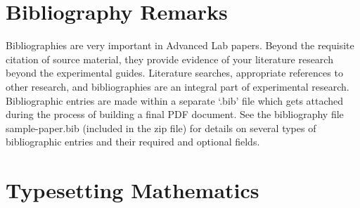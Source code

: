\section{Bibliography Remarks}

Bibliographies are very important in Advanced Lab papers.  Beyond the
requisite citation of source material, they provide evidence of your
literature research beyond the experimental guides.
Literature searches, appropriate references to other research, and bibliographies
are an integral part of experimental research.
Bibliographic entries are made within a separate `.bib'
file which gets attached during the process of building a final PDF
document.  See the bibliography file sample-paper.bib (included in the zip file)
for details on several types of bibliographic entries and their required and
optional fields.


\begin{comment}

\section{Sectioning}

The recommended \verb+aps+ option in the \verb+documentclass+ command
creates the sectioning style shown here. 

\subsection{Subsection Title}

In a short paper, you shouldn't get below subsections.

\subsubsection{Subsubsection Title}

Subsubsections look like this.

\end{comment}

\section{Typesetting Mathematics}

